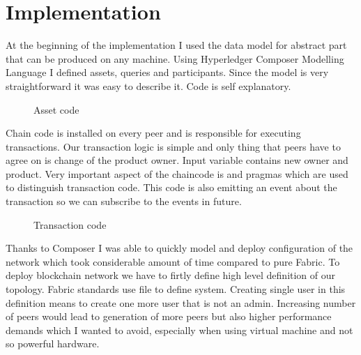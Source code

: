 \chapter{Implementation}


At the beginning of the implementation I used the data model for abstract part that can be produced on any machine. Using Hyperledger Composer Modelling Language I defined assets, queries and participants. 
Since the model is very straightforward it was easy to describe it. Code is self explanatory.

\begin{figure}[H]
    \begin{center}
        \begin{minipage}{\linewidth}
            \begin{center}
                \caption{Asset code}
                \label{obr 1.2.1}
            \end{center}
        \end{minipage}
    \end{center}
\end{figure}

Chain code is installed on every peer and is responsible for executing transactions. Our transaction logic is simple and only thing that peers have to agree on is change of the product owner. Input variable  contains new owner and product. Very important aspect of the chaincode is  and  pragmas which are used to distinguish transaction code. This code is also emitting an event about the transaction so we can subscribe to the events in future.  

\begin{figure}[H]
    \begin{center}
        \begin{minipage}{\linewidth}
            \begin{center}
                \caption{Transaction code}
                \label{obr 1.2.1}
            \end{center}
        \end{minipage}
    \end{center}
\end{figure}


Thanks to Composer I was able to quickly model and deploy configuration of the network which took considerable amount of time compared to pure Fabric. To deploy blockchain network we have to firtly define high level definition of our topology. Fabric standards use  file to define system. Creating single user in this definition means to create one more user that is not an admin. Increasing number of peers would lead to generation of more peers but also higher performance demands which I wanted to avoid, especially when using virtual machine and not so powerful hardware.


